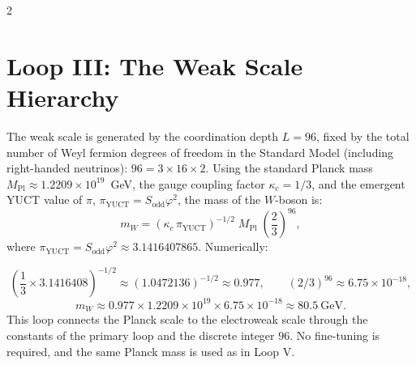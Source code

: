 \documentclass[12pt,a4paper]{article}
\begin{document}
\begin{multicols}{2}
		\section{Loop III: The Weak Scale Hierarchy}
		
		The weak scale is generated by the coordination depth \(L = 96\), fixed by the total number of Weyl fermion degrees of freedom in the Standard Model (including right-handed neutrinos): \(96 = 3 \times 16 \times 2\). Using the standard Planck mass \(M_{\mathrm{Pl}} \approx 1.2209 \times 10^{19}\)~GeV, the gauge coupling factor \(\kappa_c = 1/3\), and the emergent YUCT value of \(\pi\), \(\pi_{\mathrm{YUCT}} = S_{\mathrm{odd}}\varphi^2\), the mass of the \(W\)-boson is:
		\begin{equation}
			\boxed{m_W = \left( \kappa_c \, \pi_{\mathrm{YUCT}} \right)^{-1/2} \; M_{\mathrm{Pl}} \; \left( \frac{2}{3} \right)^{96}},
		\end{equation}
		where \(\pi_{\mathrm{YUCT}} = S_{\mathrm{odd}}\varphi^2 \approx 3.1416407865\). Numerically:
	\end{multicols}
	\small
	\[
	\left( \frac{1}{3} \times 3.1416408 \right)^{-1/2} \approx (1.0472136)^{-1/2} \approx 0.977,\qquad 
	(2/3)^{96} \approx 6.75 \times 10^{-18},
	\]
	\[
	m_W \approx 0.977 \times 1.2209 \times 10^{19} \times 6.75 \times 10^{-18} \approx 80.5\ \text{GeV}.
	\]
	This loop connects the Planck scale to the electroweak scale through the constants of the primary loop and the discrete integer \(96\). No fine-tuning is required, and the same Planck mass is used as in Loop V.
\end{document}

